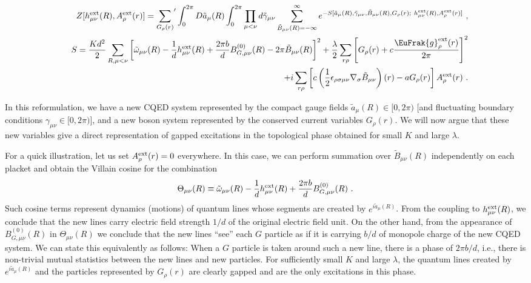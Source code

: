 \documentclass[prb,twocolumn]{revtex4-1}
\def\cG{{G}}
\def\Aext{A^{\rm ext}}
\def\hext{h^{\rm ext}}
\def\uu{B}
\begin{document}
\begin{widetext}
\begin{eqnarray}
&& Z[\hext_{\mu\nu}(R), \Aext_\rho(r)] = {\sum_{\cG_\rho(r)}}^\prime \int_0^{2\pi} D\tilde{a}_\mu(R) \int_0^{2\pi} \prod_{\mu < \nu} d\tilde{\gamma}_{\mu\nu} \sum_{\tilde{\uu}_{\mu\nu}(R) = -\infty}^\infty 
e^{-S[\tilde{a}_\mu(R), \tilde{\gamma}_{\mu\nu}, \tilde{\uu}_{\mu\nu}(R), \cG_\rho(r);~ \hext_{\mu\nu}(R), \Aext_\rho(r)]} ~,\\
&& S = \frac{K d^2}{2} \sum_{R, \mu < \nu} \left[\tilde{\omega}_{\mu\nu}(R) - \frac{1}{d} \hext_{\mu\nu}(R) + \frac{2\pi b}{d} \uu_{G, \mu\nu}^{(0)}(R) - 2\pi \tilde{\uu}_{\mu\nu}(R) \right]^2 
+ \frac{\lambda}{2} \sum_{r\rho} \left[\cG_\rho(r) + c \frac{\EuFrak{g}^{\rm ext}_\rho(r)}{2\pi} \right]^2 \label{SKlambda} \\
&& ~~~ + i \sum_{r\rho} \left[c \left(\frac{1}{2} \epsilon_{\rho\sigma\mu\nu} \nabla_\sigma \tilde{\uu}_{\mu\nu} \right)(r) - a \cG_\rho(r) \right] \Aext_\rho(r) ~.\nonumber
\end{eqnarray}
\end{widetext}
In this reformulation, we have a new CQED system represented by the compact gauge fields $\tilde{a}_\mu(R) \in [0, 2\pi)$ [and fluctuating boundary conditions $\gamma_{\mu\nu}\in [0,2\pi)$], and a new boson system represented by the conserved current variables $\cG_\rho(r)$.  We will now argue that these new variables give a direct representation of gapped excitations in the topological phase obtained for small $K$ and large $\lambda$.  

For a quick illustration, let us set $\Aext_\rho(r) = 0$ everywhere.  In this case, we can perform summation over $\tilde{\uu}_{\mu\nu}(R)$ independently on each placket and obtain the Villain cosine for the combination
\begin{eqnarray}
\Theta_{\mu\nu}(R) \equiv \tilde{\omega}_{\mu\nu}(R) - \frac{1}{d} \hext_{\mu\nu}(R) + \frac{2\pi b}{d} \uu_{G, \mu\nu}^{(0)}(R) ~.
\end{eqnarray}
Such cosine terms represent dynamics (motions) of quantum lines whose segments are created by $e^{i \tilde{a}_\mu(R)}$.  From the coupling to $\hext_{\mu\nu}(R)$, we conclude that the new lines carry electric field strength $1/d$ of the original electric field unit.  On the other hand, from the appearance of $\uu_{G, \mu\nu}^{(0)}(R)$ in $\Theta_{\mu\nu}(R)$ we conclude that the new lines ``see'' each $\cG$ particle as if it is carrying $b/d$ of monopole charge of the new CQED system.  We can state this equivalently as follows:  When a $\cG$ particle is taken around such a new line, there is a phase of $2\pi b/d$, i.e., there is non-trivial mutual statistics between the new lines and new particles.  For sufficiently small $K$ and large $\lambda$, the quantum lines created by $e^{i \tilde{a}_\mu(R)}$ and the particles represented by $\cG_\rho(r)$ are clearly gapped and are the only excitations in this phase.
\end{document}
